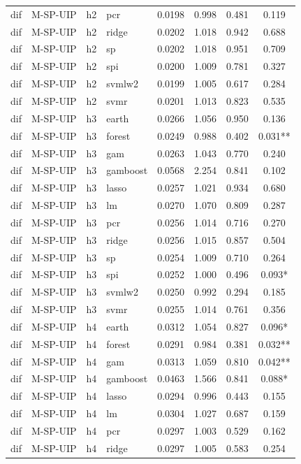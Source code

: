 \begin{ThreePartTable}
\begin{longtable}[t]{llclcccc}
dif & M-SP-UIP & h2 & pcr & 0.0198 & 0.998 & 0.481 & 0.119\\
dif & M-SP-UIP & h2 & ridge & 0.0202 & 1.018 & 0.942 & 0.688\\
dif & M-SP-UIP & h2 & sp & 0.0202 & 1.018 & 0.951 & 0.709\\
dif & M-SP-UIP & h2 & spi & 0.0200 & 1.009 & 0.781 & 0.327\\
dif & M-SP-UIP & h2 & svmlw2 & 0.0199 & 1.005 & 0.617 & 0.284\\
dif & M-SP-UIP & h2 & svmr & 0.0201 & 1.013 & 0.823 & 0.535\\
\addlinespace
dif & M-SP-UIP & h3 & earth & 0.0266 & 1.056 & 0.950 & 0.136\\
dif & M-SP-UIP & h3 & forest & 0.0249 & 0.988 & 0.402 & 0.031**\\
dif & M-SP-UIP & h3 & gam & 0.0263 & 1.043 & 0.770 & 0.240\\
dif & M-SP-UIP & h3 & gamboost & 0.0568 & 2.254 & 0.841 & 0.102\\
dif & M-SP-UIP & h3 & lasso & 0.0257 & 1.021 & 0.934 & 0.680\\
dif & M-SP-UIP & h3 & lm & 0.0270 & 1.070 & 0.809 & 0.287\\
dif & M-SP-UIP & h3 & pcr & 0.0256 & 1.014 & 0.716 & 0.270\\
dif & M-SP-UIP & h3 & ridge & 0.0256 & 1.015 & 0.857 & 0.504\\
dif & M-SP-UIP & h3 & sp & 0.0254 & 1.009 & 0.710 & 0.264\\
dif & M-SP-UIP & h3 & spi & 0.0252 & 1.000 & 0.496 & 0.093*\\
dif & M-SP-UIP & h3 & svmlw2 & 0.0250 & 0.992 & 0.294 & 0.185\\
dif & M-SP-UIP & h3 & svmr & 0.0255 & 1.014 & 0.761 & 0.356\\
\addlinespace
dif & M-SP-UIP & h4 & earth & 0.0312 & 1.054 & 0.827 & 0.096*\\
dif & M-SP-UIP & h4 & forest & 0.0291 & 0.984 & 0.381 & 0.032**\\
dif & M-SP-UIP & h4 & gam & 0.0313 & 1.059 & 0.810 & 0.042**\\
dif & M-SP-UIP & h4 & gamboost & 0.0463 & 1.566 & 0.841 & 0.088*\\
dif & M-SP-UIP & h4 & lasso & 0.0294 & 0.996 & 0.443 & 0.155\\
dif & M-SP-UIP & h4 & lm & 0.0304 & 1.027 & 0.687 & 0.159\\
dif & M-SP-UIP & h4 & pcr & 0.0297 & 1.003 & 0.529 & 0.162\\
dif & M-SP-UIP & h4 & ridge & 0.0297 & 1.005 & 0.583 & 0.254\\

\end{longtable}
\end{ThreePartTable}
